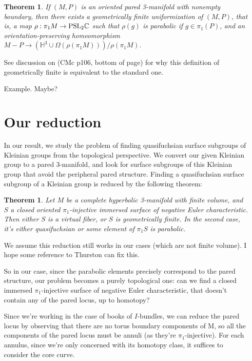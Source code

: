 \documentclass[12pt]{amsart}
\newtheorem{thm}[theorem]{Theorem}
\theoremstyle{definition}
\newcommand{\Om}{\Omega}
\newcommand{\PSL}{\mbox{\rm{PSL}}}
\begin{document}
\begin{thm}

If $(M,P)$ is an oriented pared 3-manifold with nonempty boundary, then
there exists a geometrically finite uniformization of $(M,P)$, that is, a map
$\rho: \pi_1M \to \PSL_2\mathbb{C}$ such that $\rho(g)$ is parabolic if $g \in
\pi_1(P)$, and an
orientation-preserving homeomorphism $M-P \to \left(\mathbb{H}^3
\cup \Om(\rho(\pi_1M))\right)/\rho(\pi_1M)$.

\end{thm}

See discussion on (CMc p106, bottom of page) for why this definition of
geometrically finite is equivalent to the standard one.

Example. Maybe? %

\section{Our reduction}

In our result, we study the problem of finding quasifuchsian surface subgroups
of Kleinian groups from the topological perspective. We convert our given
Kleinian group to a pared 3-manifold, and look for surface subgroups of this
Kleinian group that avoid the peripheral pared structure. Finding
a quasifuchsian surface subgroup of a Kleinian group is reduced by the
following theorem:

\begin{thm}

Let $M$ be a complete hyperbolic 3-manifold with finite volume, and $S$
a closed oriented $\pi_1$-injective immersed surface of negative Euler
characteristic. Then either $S$ is a virtual fiber, or $S$ is geometrically
finite. In the second case, it's either quasifuchsian or some element of
$\pi_1S$ is parabolic.

\end{thm}

We assume this reduction still works in our cases (which are not finite
volume). I hope some reference to Thurston can fix this.

So in our case, since the parabolic elements precisely correspond to the pared
structure, our problem becomes a purely topological one: can we find a closed
immersed $\pi_1$-injective surface of negative Euler characteristic, that
doesn't contain any of the pared locus, up to homotopy?

Since we're working in the case of books of $I$-bundles, we can reduce the
pared locus by observing that there are no torus boundary components of M, so
all the components of the pared locus must be annuli (as they're
$\pi_1$-injective). For each annulus, since we're only concerned with its
homotopy class, it suffices to consider the core curve.
\end{document}
